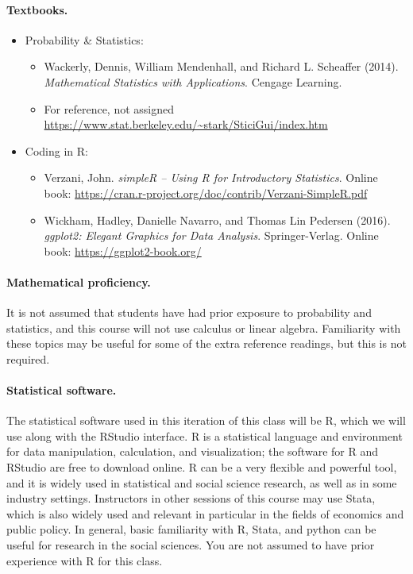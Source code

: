 \documentclass[letterpaper, 12pt, parskip=full,DIV=10]{scrartcl}
\begin{document}
\paragraph{Textbooks.}
\begin{itemize}
\item Probability \& Statistics:
\begin{itemize}
\item  Wackerly, Dennis, William Mendenhall, and Richard L. Scheaffer (2014). \textit{Mathematical Statistics with Applications}. Cengage Learning.
\item For reference, not assigned \\
\url{https://www.stat.berkeley.edu/~stark/SticiGui/index.htm}
\end{itemize}
\item Coding in R:
\begin{itemize}
\item Verzani, John. \textit{simpleR -- Using R for Introductory Statistics}. Online book: \url{https://cran.r-project.org/doc/contrib/Verzani-SimpleR.pdf}
\item Wickham, Hadley, Danielle Navarro, and Thomas Lin Pedersen (2016). \textit{ggplot2: Elegant Graphics for Data Analysis}. Springer-Verlag. Online book: \url{https://ggplot2-book.org/}
\end{itemize}
\end{itemize}

\paragraph{Mathematical proficiency.}
It is not assumed that students have had prior exposure to probability and statistics, and this course will not use calculus or linear algebra.
Familiarity with these topics may be useful for some of the extra reference readings, but this is not required.

\paragraph{Statistical software.}
The statistical software used in this iteration of this class will be R, which we will use along with the RStudio interface.
R is a statistical language and environment for data manipulation, calculation, and visualization; the software for R and RStudio are free to download online.
R can be a very flexible and powerful tool, and it is widely used in statistical and social science research, as well as in some industry settings.
Instructors in other sessions of this course may use Stata, which is also widely used and relevant in particular in the fields of economics and public policy.
In general, basic familiarity with R, Stata, and python can be useful for research in the social sciences.
You are not assumed to have prior experience with R for this class.
\end{document}
